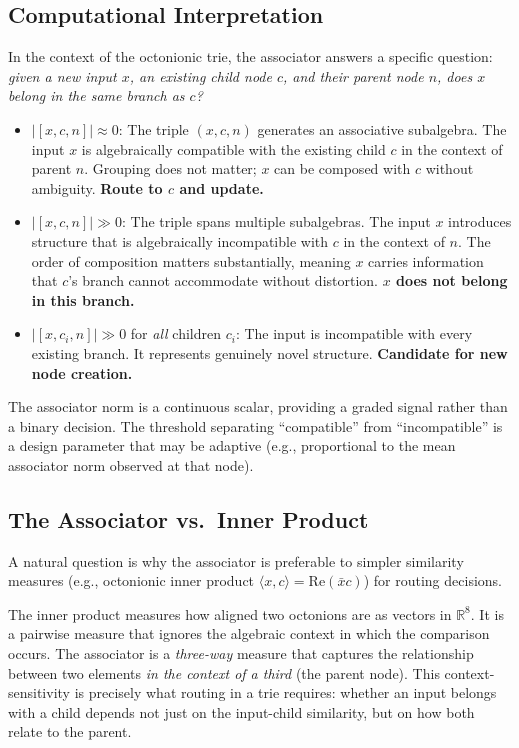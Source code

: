 \documentclass[11pt,a4paper]{article}
\theoremstyle{definition}
\theoremstyle{remark}
\newcommand{\Real}{\mathbb{R}}
\begin{document}
\subsection{Computational Interpretation}

In the context of the octonionic trie, the associator answers a specific question: \emph{given a new input $x$, an existing child node $c$, and their parent node $n$, does $x$ belong in the same branch as $c$?}

\begin{itemize}[nosep]
  \item $\lvert [x, c, n] \rvert \approx 0$: The triple $(x, c, n)$ generates an associative subalgebra. The input $x$ is algebraically compatible with the existing child $c$ in the context of parent $n$. Grouping does not matter; $x$ can be composed with $c$ without ambiguity. \textbf{Route to $c$ and update.}

  \item $\lvert [x, c, n] \rvert \gg 0$: The triple spans multiple subalgebras. The input $x$ introduces structure that is algebraically incompatible with $c$ in the context of $n$. The order of composition matters substantially, meaning $x$ carries information that $c$'s branch cannot accommodate without distortion. \textbf{$x$ does not belong in this branch.}

  \item $\lvert [x, c_i, n] \rvert \gg 0$ for \emph{all} children $c_i$: The input is incompatible with every existing branch. It represents genuinely novel structure. \textbf{Candidate for new node creation.}
\end{itemize}

The associator norm is a continuous scalar, providing a graded signal rather than a binary decision. The threshold separating ``compatible'' from ``incompatible'' is a design parameter that may be adaptive (e.g., proportional to the mean associator norm observed at that node).

\subsection{The Associator vs.\ Inner Product}

A natural question is why the associator is preferable to simpler similarity measures (e.g., octonionic inner product $\langle x, c \rangle = \text{Re}(\bar{x}c)$) for routing decisions.

The inner product measures how aligned two octonions are as vectors in $\Real^8$. It is a pairwise measure that ignores the algebraic context in which the comparison occurs. The associator is a \emph{three-way} measure that captures the relationship between two elements \emph{in the context of a third} (the parent node). This context-sensitivity is precisely what routing in a trie requires: whether an input belongs with a child depends not just on the input-child similarity, but on how both relate to the parent.
\end{document}
